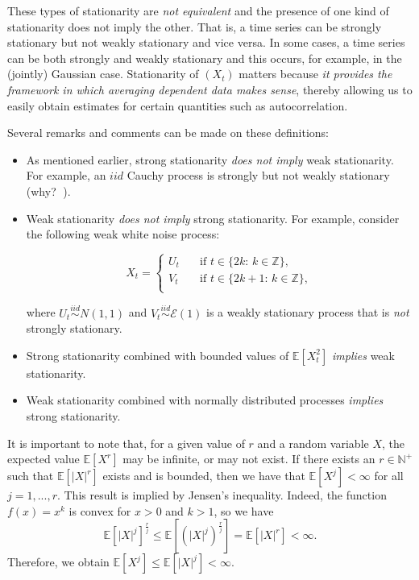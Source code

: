 \documentclass[]{book}
\theoremstyle{definition}
\theoremstyle{definition}
\theoremstyle{definition}
\theoremstyle{remark}
\let\BeginKnitrBlock\begin \let\EndKnitrBlock\end
\begin{document}
These types of stationarity are \emph{not equivalent} and the presence
of one kind of stationarity does not imply the other. That is, a time
series can be strongly stationary but not weakly stationary and vice
versa. In some cases, a time series can be both strongly and weakly
stationary and this occurs, for example, in the (jointly) Gaussian case.
Stationarity of \((X_t)\) matters because \emph{it provides the
framework in which averaging dependent data makes sense}, thereby
allowing us to easily obtain estimates for certain quantities such as
autocorrelation.

Several remarks and comments can be made on these definitions:

\begin{itemize}
\item
  As mentioned earlier, strong stationarity \emph{does not imply} weak
  stationarity. For example, an \(iid\) Cauchy process is strongly but
  not weakly stationary (why? 🤔).
\item
  Weak stationarity \emph{does not imply} strong stationarity. For
  example, consider the following weak white noise process:

  \begin{equation*}
  X_t = \begin{cases}
  U_{t}      & \quad \text{if } t \in \{2k:\, k\in \mathbb{Z} \}, \\
  V_{t}      & \quad \text{if } t \in \{2k+1:\, k\in \mathbb{Z} \},\\
  \end{cases}
  \end{equation*}

  where \({U_t} \mathop \sim \limits^{iid} N\left( {1,1} \right)\) and
  \({V_t}\mathop \sim \limits^{iid} \mathcal{E}\left( 1 \right)\) is a
  weakly stationary process that is \emph{not} strongly stationary.
\item
  Strong stationarity combined with bounded values of
  \(\mathbb{E}[X_t^2]\) \emph{implies} weak stationarity.
\item
  Weak stationarity combined with normally distributed processes
  \emph{implies} strong stationarity.
\end{itemize}

\BeginKnitrBlock{exercise}[Existence of moments]
\protect\hypertarget{exr:moment}{}{\label{exr:moment} {} }It is important to note that, for a given value of \(r\)
and a random variable \(X\), the expected value \(\mathbb{E}[X^r]\) may
be infinite, or may not exist. If there exists an \(r \in \mathbb{N}^+\)
such that \(\mathbb{E}[|X|^r]\) exists and is bounded, then we have that
\(\mathbb{E}[X^j] < \infty\) for all \(j = 1,...,r\). This result is
implied by Jensen's inequality. Indeed, the function \(f(x) = x^k\) is
convex for \(x > 0\) and \(k > 1\), so we have
\[\mathbb{E}\left[|X |^j\right]^{\frac{r}{j}} \leq \mathbb{E}\left[(|X |^j)^{\frac{r}{j}}\right] = \mathbb{E}\left[|X|^r\right] < \infty.\]
Therefore, we obtain
\(\mathbb{E}[X^j] \leq \mathbb{E}[|X|^j] < \infty\).
\EndKnitrBlock{exercise}
\end{document}

